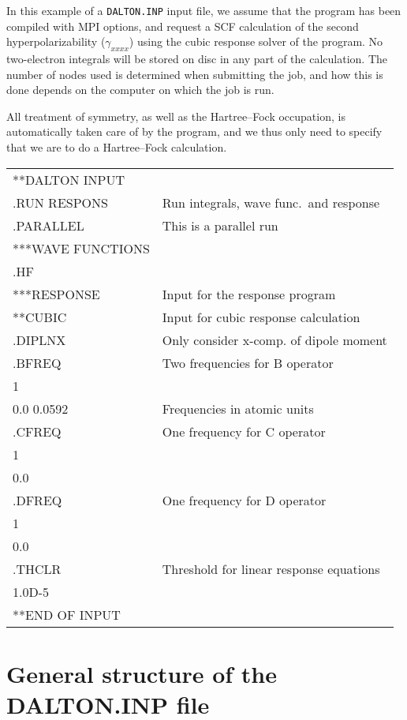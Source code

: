 In this example of a \verb|DALTON.INP| input file, we assume that
the program has been compiled with MPI options, and request a SCF
calculation of the second
hyperpolarizability
($\gamma_{xxxx}$) using
the cubic response solver
of the {\resp} program. No two-electron
integrals will be stored on disc in any part of the calculation. The
number of nodes used is determined when submitting the
job, and how
this is done depends on the computer on which the job is run.

All treatment  of symmetry, as well as the Hartree--Fock
occupation, is
automatically taken care of by the program, and we thus only need to
specify that we are to do a Hartree--Fock calculation.

{\ttfamily
\begin{tabular}{ll}
**DALTON INPUT\\
.RUN RESPONS\hspace{2.5cm} & Run integrals, wave func.\ and
response\\
.PARALLEL & This is a parallel run\\
***WAVE FUNCTIONS\\
.HF\\
***RESPONSE & Input for the response program\\
**CUBIC & Input for cubic response calculation\\
.DIPLNX & Only consider x-comp. of dipole moment\\
.BFREQ & Two frequencies for B operator\\
 1\\
 0.0 0.0592& Frequencies in atomic units\\
.CFREQ & One frequency for C operator\\
 1\\
 0.0\\
.DFREQ & One frequency for D operator\\
 1\\
 0.0\\
.THCLR & Threshold for linear response equations\\
 1.0D-5\\
**END OF INPUT\\
\end{tabular}}

\section{General structure of the DALTON.INP file}\label{sec:inputstructure}

